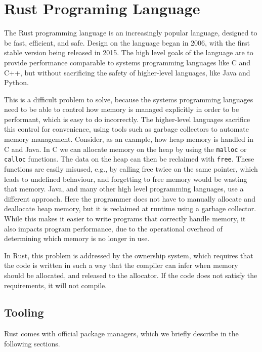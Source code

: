 \documentclass[paper=a4,%
  twoside,%
  BCOR4mm,%
  abstract=true,%
  toc=bibliography,%
  chapterprefix=true,%
  toc=bibliographynumbered,%
  open=right,%
  english,%
  pagesize=pdftex]{scrreprt}
\begin{document}
\chapter{Rust Programing Language}
\label{chap:rust-programming-language}
The Rust programming language is an increasingly popular language, designed to be fast, efficient, and safe. Design on the language began in 2006, with the first stable version being released in 2015. The high level goals of the language are to provide performance comparable to systems programming languages like C and C++, but without sacrificing the safety of higher-level languages, like Java and Python.

This is a difficult problem to solve, because the systems programming languages need to be able to control how memory is managed explicitly in order to be performant, which is easy to do incorrectly. The higher-level languages sacrifice this control for convenience, using tools such as garbage collectors to automate memory management.
Consider, as an example, how heap memory is handled in C and Java. In C we can allocate memory on the heap by using the \lstinline{malloc} or \lstinline{calloc} functions. The data on the heap can then be reclaimed with \lstinline{free}. These functions are easily misused, e.g., by calling free twice on the same pointer, which leads to undefined behaviour, and forgetting to free memory would be wasting that memory. Java, and many other high level programming languages, use a different approach. Here the programmer does not have to manually allocate and deallocate heap memory, but it is reclaimed at runtime using a garbage collector. While this makes it easier to write programs that correctly handle memory, it also impacts program performance, due to the operational overhead of determining which memory is no longer in use.

In Rust, this problem is addressed by the ownership system, which requires that the code is written in such a way that the compiler can infer when memory should be allocated, and released to the allocator. If the code does not satisfy the requirements, it will not compile.

\section{Tooling}
Rust comes with official package managers, which we briefly describe in the following sections.
\end{document}

